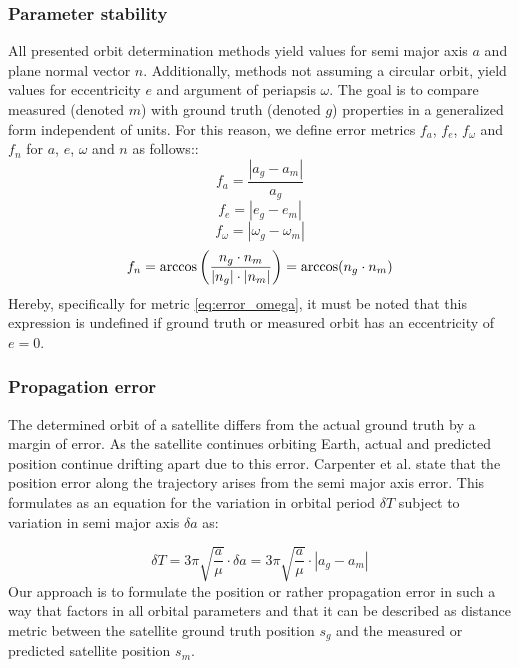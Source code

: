 \documentclass[10pt,a4paper]{article}
\begin{document}
	\subsubsection{Parameter stability}\label{sec:param_stability_definition}
	All presented orbit determination methods yield values for semi major axis $a$ and plane normal vector $n$. Additionally, methods not assuming a circular orbit, yield values for eccentricity $e$ and argument of periapsis $\omega$. The goal is to compare measured (denoted $m$) with ground truth (denoted $g$) properties in a generalized form independent of units. For this reason, we define error metrics $f_a$, $f_e$, $f_{\omega}$ and $f_n$ for $a$, $e$, $\omega$ and $n$ as follows::\newline
	\begin{equation}\label{eq:error_sma}
		f_a=\frac{|a_g-a_m|}{a_g}
	\end{equation}
	\begin{equation}\label{eq:error_ecc}
		f_e=|e_g-e_m|
	\end{equation}
	\begin{equation}\label{eq:error_omega}
		f_\omega=|\omega_g-\omega_m|
	\end{equation}
	\begin{equation}\label{eq:error_n}
		f_n=\arccos\left(\frac{n_g\cdot n_m}{|n_g|\cdot|n_m|}\right)=\arccos(n_g\cdot n_m) \\
	\end{equation}
	Hereby, specifically for metric \ref{eq:error_omega}, it must be noted that this expression is undefined if ground truth or measured orbit has an eccentricity of $e=0$.
	
	\subsubsection{Propagation error}\label{sec:error_propagation_definition}
	The determined orbit of a satellite differs from the actual ground truth by a margin of error. As the satellite continues orbiting Earth, actual and predicted position continue drifting apart due to this error. Carpenter et al. state that the position error along the trajectory arises from the semi major axis error. This formulates as an equation for the variation in orbital period $\delta T$ subject to variation in semi major axis $\delta a$ as:
	
	\begin{equation}
		\delta T = 3\pi\sqrt{\frac{a}{\mu}}\cdot\delta a = 3\pi\sqrt{\frac{a}{\mu}}\cdot|a_g-a_m|
	\end{equation}
	\noindent
	\cite{semi_major_axis_knowledge} \newline
	Our approach is to formulate the position or rather propagation error in such a way that factors in all orbital parameters and that it can be described as distance metric between the satellite ground truth position $s_g$ and the measured or predicted satellite position $s_m$.
	
\end{document}
